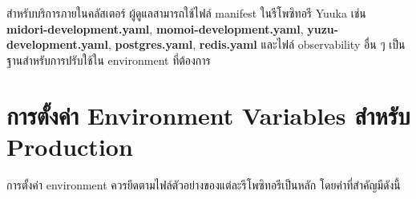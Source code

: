 \begin{figure}[htbp]
\centering
{}
\caption{}
\label{figE:SoftwareInstall}
\end{figure}

\hspace*{1.3em}
สำหรับบริการภายในคลัสเตอร์ ผู้ดูแลสามารถใช้ไฟล์ manifest ในรีโพซิทอรี Yuuka เช่น \textbf{midori-development.yaml}, \textbf{momoi-development.yaml}, \textbf{yuzu-development.yaml}, \textbf{postgres.yaml}, \textbf{redis.yaml} และไฟล์ observability อื่น ๆ เป็นฐานสำหรับการปรับใช้ใน environment ที่ต้องการ

\section{การตั้งค่า Environment Variables สำหรับ Production}
\hspace*{1.3em}
การตั้งค่า environment ควรยึดตามไฟล์ตัวอย่างของแต่ละรีโพซิทอรีเป็นหลัก โดยค่าที่สำคัญมีดังนี้


